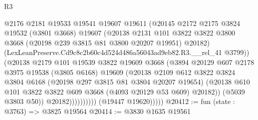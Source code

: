 \begin{lexlean}{R3}
\begin{coremodule}
                              @2176
                              @2181
                              @19533
                              @19541
                              @19607
                              @19611
                              (@20145
                                @2172
                                @2175
                                @3824
                                @19532
                                (@3801 @3668)
                                @19607
                                (@20138
                                  @2131
                                  @101
                                  @3822
                                  @3822
                                  @3800
                                  @3668
                                  (@20198 @239 @3815 @81 @3800 @20207 @19951)
                                  @20182)
                                (LexLeanPreserve.Cd9c8c2b60c4d524d486a56043ad9eb82.R3.__rel_41
                                  @3799))
                              (@20138
                                @2179
                                @101
                                @19539
                                @3822
                                @19609
                                @3668
                                (@3894
                                  @20129
                                  @607
                                  @2178
                                  @3975
                                  @19538
                                  (@3805 @6168)
                                  @19609
                                  (@20138
                                    @2109
                                    @612
                                    @3822
                                    @3824
                                    @3804
                                    @6168
                                    (@20198 @297 @3815 @81 @3804 @20207 @19654)
                                    (@20138
                                      @610
                                      @101
                                      @3822
                                      @3822
                                      @609
                                      @3668
                                      (@4093 @20129 @53 @609)
                                      @20182))
                                  (@5039 @3803 @50))
                                @20182))))))))))
            (@19447 @19620)))))
@20412 := fun (state : @3763) => @3825 @19564
@20414 := @3830 @1635 @19561

\end{coremodule}
\end{lexlean}
